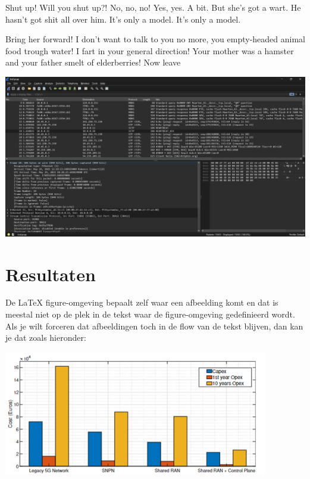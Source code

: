 \documentclass[a0,portrait]{hogent-poster}
\begin{document}
\begin{multicols}{2}
Shut up! Will you shut up?! No, no, no! Yes, yes. A bit. But she's got a wart. He hasn't got shit all over him. It's only a model. It's only a model.

Bring her forward! I don't want to talk to you no more, you empty-headed animal food trough water! I fart in your general direction! Your mother was a hamster and your father smelt of elderberries! Now leave 

\begin{center}
  \captionsetup{type=figure}
  \includegraphics[width=1.0\linewidth]{./graphics/POC-wireshark.png}
\end{center}


\section{Resultaten}

De {\LaTeX} figure-omgeving bepaalt zelf waar een afbeelding komt en dat is meestal niet op de plek in de tekst waar de figure-omgeving gedefinieerd wordt. Als je wilt forceren dat afbeeldingen toch in de flow van de tekst blijven, dan kan je dat zoals hieronder:

\begin{center}
  \captionsetup{type=figure}
  \includegraphics[width=1.0\linewidth]{./graphics/capex-opex.png}
\end{center}


\end{multicols}
\end{document}
